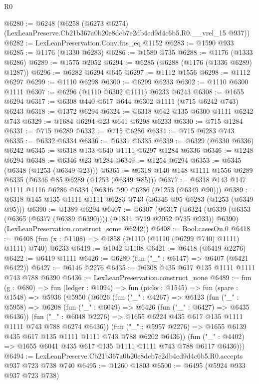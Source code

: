 \begin{lexlean}{R0}
\begin{coremodule}
@6280 := @6248
    (@6258 (@6273 @6274) (LexLeanPreserve.Cb21b367a0b20e8dcb7e2db4ed9d4c6b5.R0.__vrel_15 @937))
@6282 := LexLeanPreservation.Conv.fits_eq @1152
@6283 := @1590 @933
@6285 := @1176 (@1330 @6283)
@6286 := @1580 @735
@6288 := @1176 (@1333 @6286)
@6289 := @1575 @2052
@6294 := @6285 (@6288 (@1176 (@1336 @6289) @1287))
@6296 := @6282 @6294 @645
@6297 := @1112 @1556
@6298 := @1112 @6297
@6299 := @1110 @6298
@6300 := @6299 @6233
@6302 := @1110 @6300 @1111
@6307 := @6296 (@1110 @6302 @1111) @6233 @6243
@6308 := @1655 @6294
@6317 := @6308 @440 @617 @644 @6302 @1111 (@715 @6242 @743) @6243
@6318 := @1372 @6294
@6324 := @6318 @642 @135 @6300 @1111 @6242 @743
@6329 := @1684 @6294 @23 @641 @6298 @6233
@6330 := @715 @1284
@6331 := @715 @6289
@6332 := @715 @6286
@6334 := @715 @6283 @743
@6335 := @6332 @6334
@6336 := @6331 @6335
@6339 := @6329 (@6330 @6336) @6242
@6345 := @6318 @133 @640 @1111 @6297 @1284 @6336
@6346 := @1248 @6294
@6348 := @6346 @23 @1284
@6349 := @1254 @6294
@6353 := @6345 (@6348 (@1253 (@6349 @23)))
@6365 := @6318 @140 @148 @1111 @1556 @6289 @6335 (@6346 @85 @6289 (@1253 (@6349 @85)))
@6377 := @6318 @143 @147 @1111 @1116 @6286 @6334 (@6346 @90 @6286 (@1253 (@6349 @90)))
@6389 := @6318 @145 @135 @1111 @1111 @6283 @743 (@6346 @95 @6283 (@1253 (@6349 @95)))
@6390 := @1389 @6294
@6407 := @6307
    (@6317
      (@6324 (@6339 (@6353 (@6365 (@6377 (@6389 @6390)))) (@1834 @719 @2052 @735 @933)) @6390)
      (LexLeanPreservation.construct_some @6242))
@6408 := Bool.casesOn.{0}
@6418 := @6408 (fun (x : @1108) => @1858 (@1110 (@1110 (@6299 @740) @1111) @1111) @740) @6233
@6419 := @1042 @1108
@6421 := @6418 (@6419 @2276)
@6422 := @6419 @1111
@6426 := @6280 (fun ("_" : @6147) => @6407 (@6421 @6422))
@6427 := @6146 @2276
@6435 := @6308 @435 @617 @135 @1111 @1111 @743 @788 @6390
@6436 := LexLeanPreservation.construct_none
@6489 := fun (g : @680) =>
  fun (ledger : @1094) =>
  fun (picks : @1545) =>
  fun (spare : @1548) =>
  @5936
    (@5950
      (@6026
        (fun ("_" : @4267) =>
        @6123
          (fun ("_" : @5958) =>
          @6208
            (fun ("_" : @6049) => @6426 (fun ("_" : @6427) => @6435 @6436))
            (fun ("_" : @6048 @2276) =>
            @1655 @6224 @435 @617 @135 @1111 @1111 @743 @788 @6274 @6436))
          (fun ("_" : @5957 @2276) => @1655 @6139 @435 @617 @135 @1111 @1111 @743 @788 @6202 @6436))
        (fun ("_" : @4402) => @1655 @6041 @435 @617 @135 @1111 @1111 @743 @788 @6117 @6436)))
@6494 := LexLeanPreserve.Cb21b367a0b20e8dcb7e2db4ed9d4c6b5.R0.accepts @937 @723 @738 @740
@6495 := @1260 @1803
@6500 := @6495 (@5924 @933 @937 @723 @738)

\end{coremodule}
\end{lexlean}
